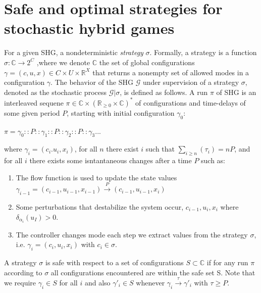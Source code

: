   \section{Safe and optimal strategies for stochastic hybrid games}
    \label{sec:safeandoptimal}
    For a given \ac{SHG}, a nondeterministic \emph{strategy} $\sigma$.
    Formally, a strategy is a function $\sigma: \mathbb{C} \rightarrow 2^C$
    ,where we denote $\mathbb{C}$ the set of global configurations 
    $\gamma = (c,u,x) \in C \times U \times \mathbb{R}^X$
    that returns a nonempty set of allowed modes in a configuration  
    $\gamma$.
    The behavior of the \ac{SHG} $\mathcal{G}$ under supervision of a 
    strategy $\sigma$, denoted as the stochastic process $\mathcal{G}|\sigma$,
    is defined as follows. A run $\pi$ of \ac{SHG} is an interleaved 
    sequene $\pi \in \mathbb{C} \times (\mathbb{R}_{\geqslant 0} 
    \times \mathbb{C})^{*}$ of configurations and time-delays of 
    some given period $P$, starting with initial configuration $\gamma_0$: 
    \begin{center}
      $\pi = \gamma_0 :: P :: \gamma_1 :: P :: \gamma_2 :: P :: \gamma_3 ...$  
    \end{center}
    where $\gamma_i=(c_i.u_i,x_i)$, for all $n$ there exist $i$
    such that $\sum_{i \geqslant n}(\tau_i) = nP$, and for all $i$
    there exists some isntantaneous changes after a time $P$ such as:

    \begin{enumerate}
      \item The flow function is used to update the state values
      $\gamma_{i-1}=(c_{i-1}, u_{i-1}, x_{i-1}) \xrightarrow{P} (c_{i-1}, u_{i-1}, x_{i})$ 
      \item Some perturbations that destabilize the system occur, 
      $c_{i-1},u_i,x_i$ where $\delta_{\alpha_i}(u_I) > 0$.
      \item The controller changes mode each step we extract 
      values from the strategy $\sigma$, i.e. $\gamma_i=(c_i,u_i,x_i)$ 
      with $c_i \in \sigma$. 
    \end{enumerate}
    

    
    
    A strategy $\sigma$ is safe with respect to a set of configurations
    $S \subset \mathbb{C}$ if for any run $\pi$ according to $\sigma$ 
    all configurations encountered are within the safe set S.
    Note that we require $\gamma_i \in S$ for all $i$ and also 
    $\gamma'_i \in S$ whenever $\gamma_i \xrightarrow{\tau} \gamma'_i$ 
    with $\tau \geqslant P$.
    
